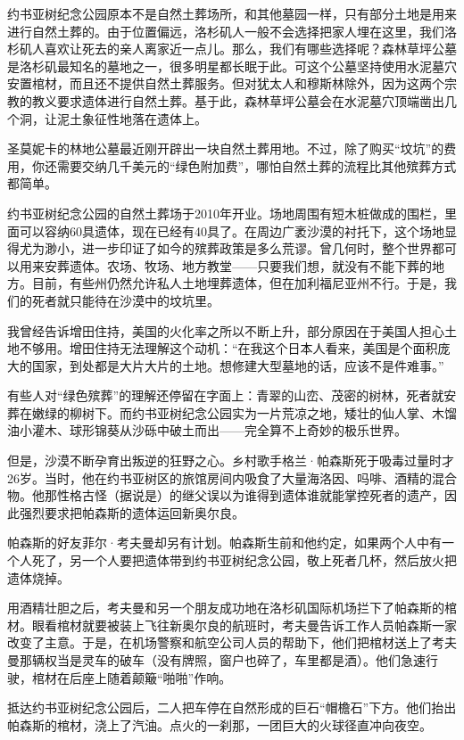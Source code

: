 \documentclass[12pt,oneside]{book}
\begin{document}
\begin{bookref}[frametitle={\cite{好好告别}}]
约书亚树纪念公园原本不是自然土葬场所，和其他墓园一样，只有部分土地是用来进行自然土葬的。由于位置偏远，洛杉矶人一般不会选择把家人埋在这里，我们洛杉矶人喜欢让死去的亲人离家近一点儿。那么，我们有哪些选择呢？森林草坪公墓是洛杉矶最知名的墓地之一，很多明星都长眠于此。可这个公墓坚持使用水泥墓穴安置棺材，而且还不提供自然土葬服务。但对犹太人和穆斯林除外，因为这两个宗教的教义要求遗体进行自然土葬。基于此，森林草坪公墓会在水泥墓穴顶端凿出几个洞，让泥土象征性地落在遗体上。

圣莫妮卡的林地公墓最近刚开辟出一块自然土葬用地。不过，除了购买“坟坑”的费用，你还需要交纳几千美元的“绿色附加费”，哪怕自然土葬的流程比其他殡葬方式都简单。

约书亚树纪念公园的自然土葬场于2010年开业。场地周围有短木桩做成的围栏，里面可以容纳60具遗体，现在已经有40具了。在周边广袤沙漠的衬托下，这个场地显得尤为渺小，进一步印证了如今的殡葬政策是多么荒谬。曾几何时，整个世界都可以用来安葬遗体。农场、牧场、地方教堂——只要我们想，就没有不能下葬的地方。目前，有些州仍然允许私人土地埋葬遗体，但在加利福尼亚州不行。于是，我们的死者就只能待在沙漠中的坟坑里。

我曾经告诉增田住持，美国的火化率之所以不断上升，部分原因在于美国人担心土地不够用。增田住持无法理解这个动机：“在我这个日本人看来，美国是个面积庞大的国家，到处都是大片大片的土地。想修建大型墓地的话，应该不是件难事。”

有些人对“绿色殡葬”的理解还停留在字面上：青翠的山峦、茂密的树林，死者就安葬在嫩绿的柳树下。而约书亚树纪念公园实为一片荒凉之地，矮壮的仙人掌、木馏油小灌木、球形锦葵从沙砾中破土而出——完全算不上奇妙的极乐世界。

但是，沙漠不断孕育出叛逆的狂野之心。乡村歌手格兰·帕森斯死于吸毒过量时才26岁。当时，他在约书亚树区的旅馆房间内吸食了大量海洛因、吗啡、酒精的混合物。他那性格古怪（据说是）的继父误以为谁得到遗体谁就能掌控死者的遗产，因此强烈要求把帕森斯的遗体运回新奥尔良。

帕森斯的好友菲尔·考夫曼却另有计划。帕森斯生前和他约定，如果两个人中有一个人死了，另一个人要把遗体带到约书亚树纪念公园，敬上死者几杯，然后放火把遗体烧掉。

用酒精壮胆之后，考夫曼和另一个朋友成功地在洛杉矶国际机场拦下了帕森斯的棺材。眼看棺材就要被装上飞往新奥尔良的航班时，考夫曼告诉工作人员帕森斯一家改变了主意。于是，在机场警察和航空公司人员的帮助下，他们把棺材送上了考夫曼那辆权当是灵车的破车（没有牌照，窗户也碎了，车里都是酒）。他们急速行驶，棺材在后座上随着颠簸“啪啪”作响。

抵达约书亚树纪念公园后，二人把车停在自然形成的巨石“帽檐石”下方。他们抬出帕森斯的棺材，浇上了汽油。点火的一刹那，一团巨大的火球径直冲向夜空。


\end{bookref}
\end{document}
